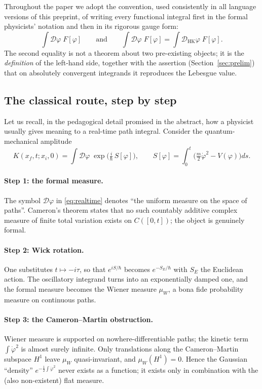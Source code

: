 \documentclass[11pt,a4paper]{article}
\theoremstyle{plain}
\theoremstyle{definition}
\theoremstyle{remark}
\newcommand{\dphi}{\mathcal{D}\varphi}
\newcommand{\dhk}{\mathcal{D}_{\mathrm{HK}}\varphi}
\begin{document}
Throughout the paper we adopt the convention, used consistently in all language versions
of this preprint, of writing every functional integral first in the formal physicists'
notation and then in its rigorous gauge form:
\[
\int \dphi\; F[\varphi]
\qquad\text{and}\qquad
\int \dphi\; F[\varphi]
=
\int \dhk\; F[\varphi].
\]
The second equality is not a theorem about two pre-existing objects; it is the
\emph{definition} of the left-hand side, together with the assertion (Section~\ref{sec:prelim})
that on absolutely convergent integrands it reproduces the Lebesgue value.

\subsection{The classical route, step by step}
\label{sec:classical}

Let us recall, in the pedagogical detail promised in the abstract, how a physicist
usually gives meaning to a real-time path integral. Consider the quantum-mechanical
amplitude
\begin{equation}
\label{eq:realtime}
K(x_f,t;x_i,0)=\int \dphi\;
\exp\!\Big(\tfrac{i}{\hbar}\,S[\varphi]\Big),
\qquad
S[\varphi]=\int_0^t\Big(\tfrac{m}{2}\dot\varphi^2-V(\varphi)\Big)ds .
\end{equation}

\paragraph{Step 1: the formal measure.}
The symbol $\dphi$ in \eqref{eq:realtime} denotes ``the uniform measure on the space of
paths''. Cameron's theorem states that no such countably additive complex measure of
finite total variation exists on $C([0,t])$; the object is genuinely formal.

\paragraph{Step 2: Wick rotation.}
One substitutes $t\mapsto -i\tau$, so that $e^{iS/\hbar}$ becomes $e^{-S_E/\hbar}$ with
$S_E$ the Euclidean action. The oscillatory integrand turns into an exponentially damped
one, and the formal measure becomes the Wiener measure $\mu_W$, a bona fide probability
measure on continuous paths.

\paragraph{Step 3: the Cameron--Martin obstruction.}
Wiener measure is supported on nowhere-differentiable paths; the kinetic term
$\int\dot\varphi^2$ is almost surely infinite. Only translations along the
Cameron--Martin subspace $H^1$ leave $\mu_W$ quasi-invariant, and $\mu_W(H^1)=0$. Hence
the Gaussian ``density'' $e^{-\frac12\int\dot\varphi^2}$ never exists as a function; it
exists only in combination with the (also non-existent) flat measure.
\end{document}
